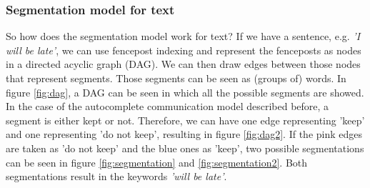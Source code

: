 \documentclass[a4paper, 12pt]{report}
\begin{document}
\subsubsection{Segmentation model for text}
So how does the segmentation model work for text? 
If we have a sentence, e.g. \textit{'I will be late'}, we can use fencepost indexing and represent the fenceposts as nodes in a directed acyclic graph (DAG). 
We can then draw edges between those nodes that represent segments. 
Those segments can be seen as (groups of) words. 
In figure \ref{fig:dag}, a DAG can be seen in which all the possible segments are showed. 
In the case of the autocomplete communication model described before, a segment is either kept or not.
Therefore, we can have one edge representing 'keep' and one representing 'do not keep', resulting in figure \ref{fig:dag2}.
If the pink edges are taken as 'do not keep' and the blue ones as 'keep', two possible segmentations can be seen in figure \ref{fig:segmentation} and \ref{fig:segmentation2}. 
Both segmentations result in the keywords \textit{'will be late'}. 
\end{document}
